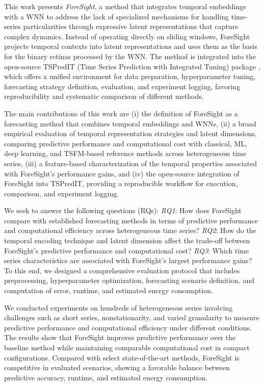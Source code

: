 \documentclass[final,3p,times,twocolumn,authoryear]{elsarticle}
\begin{document}
This work presents \textit{ForeSight}, a method that integrates temporal embeddings with a WNN to address the lack of specialized mechanisms for handling time-series particularities through expressive latent representations that capture complex dynamics. Instead of operating directly on sliding windows, ForeSight projects temporal contexts into latent representations and uses them as the basis for the binary retinas processed by the WNN. The method is integrated into the open-source TSPredIT (Time Series Prediction with Integrated Tuning) package \citep{anonymous_2023}, which offers a unified environment for data preparation, hyperparameter tuning, forecasting strategy definition, evaluation, and experiment logging, favoring reproducibility and systematic comparison of different methods.

The main contributions of this work are (i) the definition of ForeSight as a forecasting method that combines temporal embeddings and WNNs, (ii) a broad empirical evaluation of temporal representation strategies and latent dimensions, comparing predictive performance and computational cost with classical, ML, deep learning, and TSFM-based reference methods across heterogeneous time series, (iii) a feature-based characterization of the temporal properties associated with ForeSight's performance gains, and (iv) the open-source integration of ForeSight into TSPredIT, providing a reproducible workflow for execution, comparison, and experiment logging.

We seek to answer the following questions (RQs): \textit{RQ1}: How does ForeSight compare with established forecasting methods in terms of predictive performance and computational efficiency across heterogeneous time series? \textit{RQ2}: How do the temporal encoding technique and latent dimension affect the trade-off between ForeSight's predictive performance and computational cost? \textit{RQ3}: Which time series characteristics are associated with ForeSight's largest performance gains? To this end, we designed a comprehensive evaluation protocol that includes preprocessing, hyperparameter optimization, forecasting scenario definition, and computation of error, runtime, and estimated energy consumption.

We conducted experiments on hundreds of heterogeneous series involving challenges such as short series, nonstationarity, and varied granularity to measure predictive performance and computational efficiency under different conditions. The results show that ForeSight improves predictive performance over the baseline method while maintaining comparable computational cost in compact configurations. Compared with select state-of-the-art methods, ForeSight is competitive in evaluated scenarios, showing a favorable balance between predictive accuracy, runtime, and estimated energy consumption.
\end{document}
